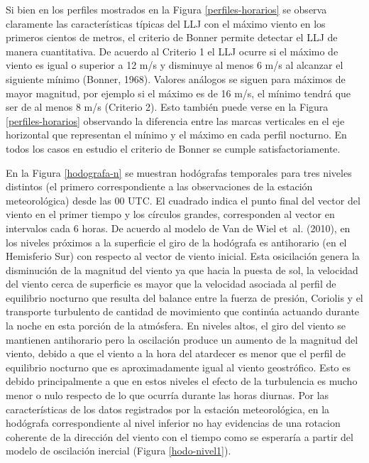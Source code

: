 \documentclass[12pt,spanish,oneside, a4paper]{book}
\begin{document}
Si bien en los perfiles mostrados en la Figura \ref{perfiles-horarios}
se observa claramente las características típicas del LLJ con el máximo
viento en los primeros cientos de metros, el criterio de Bonner permite
detectar el LLJ de manera cuantitativa. De acuerdo al Criterio 1 el LLJ
ocurre si el máximo de viento es igual o superior a 12 m/s y disminuye
al menos 6 m/s al alcanzar el siguiente mínimo (Bonner, 1968). Valores
análogos se siguen para máximos de mayor magnitud, por ejemplo si el
máximo es de 16 m/s, el mínimo tendrá que ser de al menos 8 m/s
(Criterio 2). Esto también puede verse en la Figura
\ref{perfiles-horarios} observando la diferencia entre las marcas
verticales en el eje horizontal que representan el mínimo y el máximo en
cada perfil nocturno. En todos los casos en estudio el criterio de
Bonner se cumple satisfactoriamente.

En la Figura \ref{hodografa-n} se muestran hodógrafas temporales para
tres niveles distintos (el primero correspondiente a las observaciones
de la estación meteorológica) desde las 00 UTC. El cuadrado indica el
punto final del vector del viento en el primer tiempo y los círculos
grandes, corresponden al vector en intervalos cada 6 horas. De acuerdo
al modelo de Van de Wiel et~al. (2010), en los niveles próximos a la
superficie el giro de la hodógrafa es antihorario (en el Hemisferio Sur)
con respecto al vector de viento inicial. Esta osicilación genera la
disminución de la magnitud del viento ya que hacia la puesta de sol, la
velocidad del viento cerca de superficie es mayor que la velocidad
asociada al perfil de equilibrio nocturno que resulta del balance entre
la fuerza de presión, Coriolis y el transporte turbulento de cantidad de
movimiento que continúa actuando durante la noche en esta porción de la
atmósfera. En niveles altos, el giro del viento se mantienen antihorario
pero la oscilación produce un aumento de la magnitud del viento, debido
a que el viento a la hora del atardecer es menor que el perfil de
equilibrio nocturno que es aproximadamente igual al viento geostrófico.
Esto es debido principalmente a que en estos niveles el efecto de la
turbulencia es mucho menor o nulo respecto de lo que ocurría durante las
horas diurnas. Por las características de los datos registrados por la
estación meteorológica, en la hodógrafa correspondiente al nivel
inferior no hay evidencias de una rotacion coherente de la dirección del
viento con el tiempo como se esperaría a partir del modelo de oscilación
inercial (Figura \ref{hodo-nivel1}).
\end{document}
